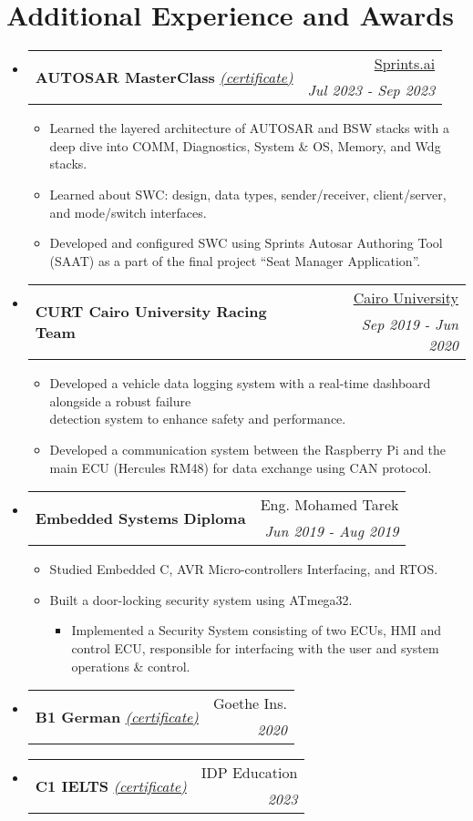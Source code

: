 \documentclass[letterpaper,11pt]{article}
\makeatletter
\newcommand{\CvSubheadingWithoutTitle}[3]{
  \vspace{-1pt}\item
    \begin{tabular*}{0.97\textwidth}{l@{\extracolsep{\fill}}r}
    \multirow{2}{*}{\textbf{#1}} & #2 \\
     & \textit{\small #3} \\
    \end{tabular*}\vspace{-5pt}
}
\newcommand{\CvSubheadingWithdocumentWithoutTitle}[4]{
  \vspace{-1pt}\item
    \begin{tabular*}{0.97\textwidth}{l@{\extracolsep{\fill}}r}
    \multirow{2}{*}{\textbf{#1} \textit{\small#2}} & #3 \\
     & \textit{\small #4} \\
    \end{tabular*}\vspace{-5pt}
}
\newcommand{\CvSubHeadingListStart}{\begin{itemize}[leftmargin=*,topsep = 0pt]}
\newcommand{\CvSubHeadingListEnd}{\end{itemize}}
\makeatother
\begin{document}
\section{Additional Experience and Awards}
    \CvSubHeadingListStart
        \CvSubheadingWithdocumentWithoutTitle
        {AUTOSAR MasterClass}
        {\href{https://drive.google.com/file/d/11J9nzdQyJXEV8ALsv8E3fltjN7ahh1VI/view?usp=sharing}{(certificate)}}{\href{https://sprints.ai/}{Sprints.ai}}
        {Jul 2023 - Sep 2023}
        {\begin{itemize}[topsep = 2pt, itemsep = -2pt]
          \item Learned the layered architecture of AUTOSAR and BSW stacks with a deep dive into COMM, Diagnostics, System \& OS, Memory, and Wdg stacks.
          \item Learned about SWC: design, data types, sender/receiver, client/server, and mode/switch interfaces.
          \item Developed and configured SWC using Sprints Autosar Authoring Tool (SAAT) as a part of the final project “Seat Manager Application”.
      \end{itemize}}
        \CvSubheadingWithoutTitle
        {CURT Cairo University Racing Team}{\href{https://www.facebook.com/curt.fs}{Cairo University}}
        {Sep 2019 - Jun 2020 }
            {\begin{itemize}[topsep = 2pt, itemsep = -2pt]
                \item Developed a vehicle data logging system with a real-time dashboard alongside a robust failure \\detection system to enhance safety and performance.
                \item Developed a communication system between the Raspberry Pi and the main ECU (Hercules RM48) for data exchange using CAN protocol.
            \end{itemize}}
    \CvSubheadingWithoutTitle
        {Embedded Systems Diploma}{Eng. Mohamed Tarek}
        {Jun 2019 - Aug 2019 }
            \begin{itemize}[topsep = 2pt, itemsep = -2pt]
                \item Studied Embedded C, AVR Micro-controllers Interfacing, and RTOS.
                \item Built a door-locking security system using ATmega32.
                \begin{itemize}[topsep = -1pt]
                    \item Implemented a Security System consisting of two ECUs, HMI and control ECU, responsible for interfacing with the user and system operations \& control.
                \end{itemize} 
            \end{itemize}
    \CvSubheadingWithdocumentWithoutTitle
    {B1 German}
    {\href{https://drive.google.com/file/d/1ZqeyzqQ8irMl0aZzunjAWck2Ln38SIRa/view?usp=sharing}{(certificate)}} {Goethe Ins.} {2020}
    \CvSubheadingWithdocumentWithoutTitle
    {C1 IELTS} 
    {\href{https://drive.google.com/file/d/1_vvIMufJvqv6IeRRYlNu3F9-kVY1O3jM/view?usp=sharing}{(certificate)}} { IDP Education} {2023}
    \CvSubHeadingListEnd
%
\end{document}
